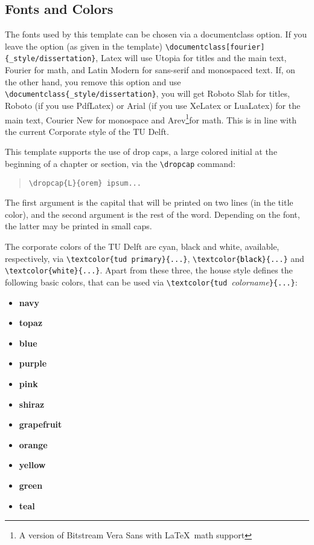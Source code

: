 \begin{refsection}
\section{Fonts and Colors}

\dropcap T{he} fonts used by this template can be chosen via a documentclass option. If you leave the option (as given in the template) \verb|\documentclass|\allowbreak\verb|[fourier]|\allowbreak\verb|{_style/dissertation}|, Latex will use Utopia for titles and the main text, Fourier for math, and Latin Modern for sans-serif and monospaced text.
If, on the other hand, you remove this option and use \verb|\documentclass|\allowbreak\verb|{_style/|\allowbreak\verb|dissertation}|,  you will get Roboto Slab for titles, Roboto (if you use PdfLatex) or Arial (if you use XeLatex or LuaLatex) for the main text, Courier New for monospace and Arev\footnote{A version of Bitstream Vera Sans with \LaTeX\ math support}for math.
This is in line with the current Corporate style of the TU Delft.

This template supports the use of drop caps, a large colored initial at the beginning of a chapter or section, via the \verb|\dropcap| command:

\begin{quote}
\verb|\dropcap{L}{orem} ipsum...|
\end{quote}
The first argument is the capital that will be printed on two lines (in the title color), and the second argument is the rest of the word. Depending on the font, the latter may be printed in small caps.

The corporate colors of the TU Delft are cyan, black and white, available, respectively, via \verb|\textcolor{|\textcolor{tud primary}{\texttt{tud primary}}\verb|}{...}|, \verb|\textcolor|\allowbreak\texttt{\{\textcolor{black}{black}\}\{...\}} and \verb|\textcolor{|\allowbreak\texttt{white}\verb|}{...}|.
Apart from these three, the house style defines the following basic colors, that can be used via \verb|\textcolor{tud |\textit{colorname}\verb|}{...}|:
\begin{itemize}
  \itemsep 0pt
  \parskip 0pt
  \item \textcolor{tud navy}{\textbf{navy}}
  \item \textcolor{tud topaz}{\textbf{topaz}}
  \item \textcolor{tud blue}{\textbf{blue}}
  \item \textcolor{tud purple}{\textbf{purple}}
  \item \textcolor{tud pink}{\textbf{pink}}
  \item \textcolor{tud shiraz}{\textbf{shiraz}}
  \item \textcolor{tud grapefruit}{\textbf{grapefruit}}
  \item \textcolor{tud orange}{\textbf{orange}}
  \item \textcolor{tud yellow}{\textbf{yellow}}
  \item \textcolor{tud green}{\textbf{green}}
  \item \textcolor{tud teal}{\textbf{teal}}
\end{itemize}


\end{refsection}
